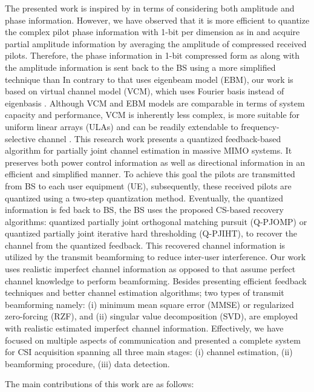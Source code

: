 The presented work is inspired by \cite{beamblock} in terms of considering both amplitude and phase information. However, we have observed that it is more efficient to quantize the complex pilot phase information with 1-bit per dimension as in  \cite{mainref-1bit} and acquire partial amplitude information by averaging the amplitude of compressed received pilots.  Therefore, the phase information in 1-bit compressed form as  \cite{mainref-1bit} along with the amplitude information is sent back to the BS using a more simplified  technique than \cite{beamblock} In contrary to \cite{beamblock} that uses eigenbeam model (EBM),  our work is based on virtual channel model (VCM), which uses Fourier basis instead of eigenbasis \cite{exp-vitual}. Although VCM and EBM models are comparable in terms of system capacity and performance, VCM is inherently less complex, is more suitable for uniform linear arrays (ULAs) and can be readily extendable to frequency-selective channel \cite{exp-vitual}.
This research work presents a quantized feedback-based algorithm for partially joint channel estimation in massive MIMO systems. It preserves both power control information as well as directional information in an efficient and simplified manner. To achieve this goal the pilots are transmitted from BS to each user equipment (UE), subsequently, these received pilots are quantized using a two-step quantization method.  Eventually, the quantized information is fed back to BS, the BS uses the proposed CS-based recovery algorithms: quantized partially joint orthogonal matching pursuit (Q-PJOMP) or quantized partially joint iterative hard thresholding (Q-PJIHT), to recover the channel from the quantized feedback. This recovered channel information is utilized by the transmit beamforming to reduce inter-user interference. Our work uses realistic imperfect channel information as opposed to \cite{mainref-joint,mainref-1bit} that assume perfect channel knowledge to perform beamforming.
Besides presenting efficient feedback techniques and better channel estimation algorithms; two types of transmit beamforming namely: (i) minimum mean square error (MMSE) or regularized zero-forcing (RZF), and (ii) singular value decomposition (SVD), are employed with realistic estimated imperfect channel information. Effectively, we have focused on multiple aspects of communication and presented a complete system for CSI acquisition spanning all three main stages: (i) channel estimation, (ii) beamforming procedure, (iii) data detection. 

The main contributions of this work are as follows:

